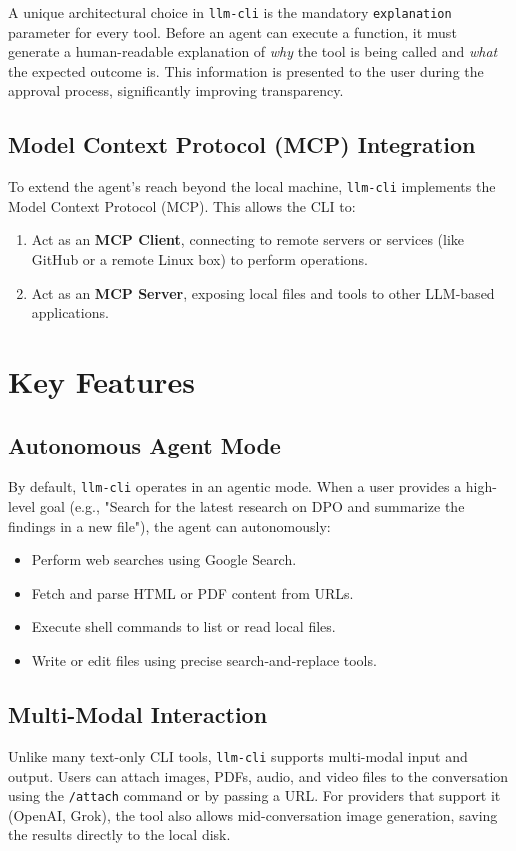 \documentclass[conference]{IEEEtran}
\begin{document}
A unique architectural choice in \texttt{llm-cli} is the mandatory \texttt{explanation} parameter for every tool. Before an agent can execute a function, it must generate a human-readable explanation of \textit{why} the tool is being called and \textit{what} the expected outcome is. This information is presented to the user during the approval process, significantly improving transparency.

\subsection{Model Context Protocol (MCP) Integration}
To extend the agent's reach beyond the local machine, \texttt{llm-cli} implements the Model Context Protocol (MCP). This allows the CLI to:
\begin{enumerate}
    \item Act as an \textbf{MCP Client}, connecting to remote servers or services (like GitHub or a remote Linux box) to perform operations.
    \item Act as an \textbf{MCP Server}, exposing local files and tools to other LLM-based applications.
\end{enumerate}

\section{Key Features}

\subsection{Autonomous Agent Mode}
By default, \texttt{llm-cli} operates in an agentic mode. When a user provides a high-level goal (e.g., "Search for the latest research on DPO and summarize the findings in a new file"), the agent can autonomously:
\begin{itemize}
    \item Perform web searches using Google Search.
    \item Fetch and parse HTML or PDF content from URLs.
    \item Execute shell commands to list or read local files.
    \item Write or edit files using precise search-and-replace tools.
\end{itemize}

\subsection{Multi-Modal Interaction}
Unlike many text-only CLI tools, \texttt{llm-cli} supports multi-modal input and output. Users can attach images, PDFs, audio, and video files to the conversation using the \texttt{/attach} command or by passing a URL. For providers that support it (OpenAI, Grok), the tool also allows mid-conversation image generation, saving the results directly to the local disk.
\end{document}
